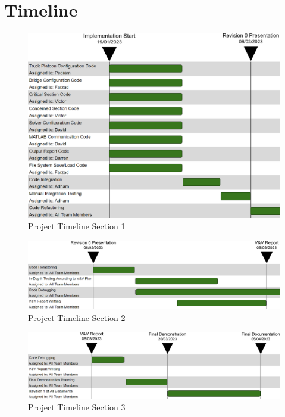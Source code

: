 \documentclass[12pt, titlepage]{article}
\begin{document}
\section{Timeline}

\begin{figure}[H]
  \includegraphics[scale=0.7]{../images/Timeline1.PNG}
  \caption{Project Timeline Section 1}
  \label{fig:timeline1}
\end{figure}

\begin{landscape}
\newpage

\begin{figure}[H]
  \includegraphics[scale=0.65]{../images/Timeline2.PNG}
  \caption{Project Timeline Section 2}
  \label{fig:timeline2}
\end{figure}

\begin{figure}[H]
  \includegraphics[scale=0.65]{../images/Timeline3.PNG}
  \caption{Project Timeline Section 3}
  \label{fig:timeline3}
\end{figure}

\end{landscape}
\end{document}
